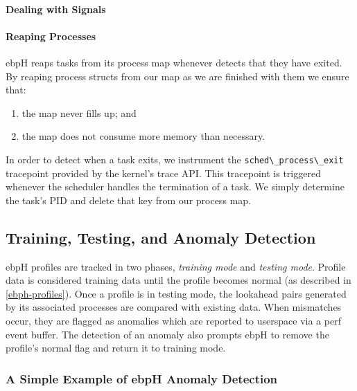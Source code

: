 \documentclass[
  12pt]{findlay}
\newcommand{\passthrough}[1]{#1}
\providecommand{\tightlist}{%
  \setlength{\itemsep}{0pt}\setlength{\parskip}{0pt}}
\begin{document}
\hypertarget{dealing-with-signals}{%
\paragraph{Dealing with Signals}\label{dealing-with-signals}}

\hypertarget{reaping-processes}{%
\paragraph{Reaping Processes}\label{reaping-processes}}

ebpH reaps tasks from its process map whenever detects that they have
exited. By reaping process structs from our map as we are finished with
them we ensure that:

\begin{enumerate}
\def\labelenumi{\alph{enumi})}
\tightlist
\item
  the map never fills up; and
\item
  the map does not consume more memory than necessary.
\end{enumerate}

In order to detect when a task exits, we instrument the
\passthrough{\lstinline!sched\_process\_exit!} tracepoint provided by
the kernel's trace API. This tracepoint is triggered whenever the
scheduler handles the termination of a task. We simply determine the
task's PID and delete that key from our process map.

\hypertarget{training-testing-and-anomaly-detection}{%
\subsection{Training, Testing, and Anomaly
Detection}\label{training-testing-and-anomaly-detection}}

ebpH profiles are tracked in two phases, \emph{training mode} and
\emph{testing mode}. Profile data is considered training data until the
profile becomes normal (as described in \autoref{ebph-profiles}). Once a
profile is in testing mode, the lookahead pairs generated by its
associated processes are compared with existing data. When mismatches
occur, they are flagged as anomalies which are reported to userspace via
a perf event buffer. The detection of an anomaly also prompts ebpH to
remove the profile's normal flag and return it to training mode.

\hypertarget{a-simple-example-of-ebph-anomaly-detection}{%
\subsubsection{A Simple Example of ebpH Anomaly
Detection}\label{a-simple-example-of-ebph-anomaly-detection}}
\end{document}
